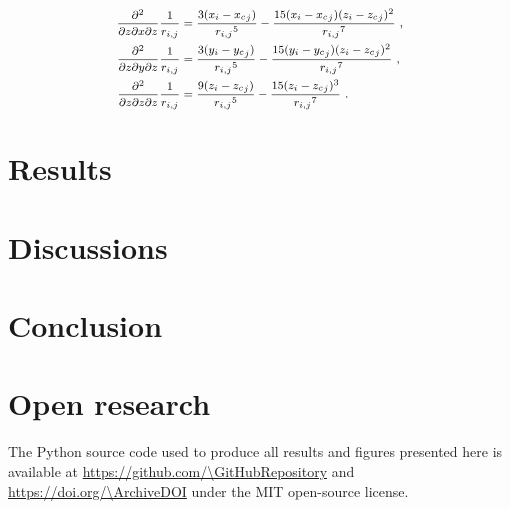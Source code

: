 \begin{equation}
\footnotesize
\begin{aligned}
\dfrac{\partial^2}{\partial z \partial x \partial z} \dfrac{1}{r_{i,j}} &=
\dfrac{3(x_i - {x_c}_j)}{{r_{i,j}}^5} - \dfrac{15(x_i - {x_c}_j)(z_i - {z_c}_j)^2}{{r_{i,j}}^7}\ ,
\\
\dfrac{\partial^2}{\partial z \partial y \partial z} \dfrac{1}{r_{i,j}} &=
\dfrac{3(y_i - {y_c}_j)}{{r_{i,j}}^5} - \dfrac{15(y_i - {y_c}_j)(z_i - {z_c}_j)^2}{{r_{i,j}}^7}\ ,
\\
\dfrac{\partial^2}{\partial z \partial z \partial z} \dfrac{1}{r_{i,j}} &=
\dfrac{9(z_i - {z_c}_j)}{{r_{i,j}}^5} - \dfrac{15(z_i - {z_c}_j)^3}{{r_{i,j}}^7}\ .
\end{aligned}
\end{equation}   \bigskip



\section{Results}





\section{Discussions}


\section{Conclusion}



\section{Open research}

The Python source code used to produce all results and figures presented here
is available at \url{https://github.com/\GitHubRepository} and
\url{https://doi.org/\ArchiveDOI} under the MIT open-source license.

